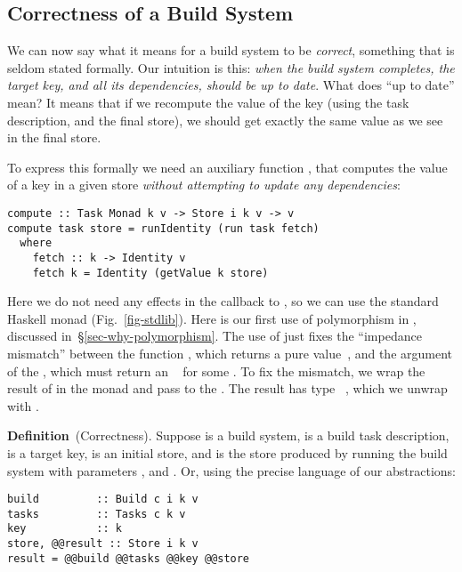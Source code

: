 \subsection{Correctness of a Build System}\label{sec-build-correctness}

We can now say what it means for a build system to be \emph{correct}, something
that is seldom stated formally. Our intuition is this: \emph{when the build
system completes, the target key, and all its dependencies, should be up to
date}. What does ``up to date'' mean? It means that if we recompute the value of
the key (using the task description, and the final store), we should get exactly
the same value as we see in the final store.

To express this formally we need an auxiliary function , that
computes the value of a key in a given store \emph{without attempting to update
any dependencies}:

\begin{verbatim}
compute :: Task Monad k v -> Store i k v -> v
compute task store = runIdentity (run task fetch)
  where
    fetch :: k -> Identity v
    fetch k = Identity (getValue k store)
\end{verbatim}

\noindent
Here we do not need any effects in the  callback to , so
we can use the standard Haskell  monad (Fig.~\ref{fig-stdlib}).
Here is our first use of polymorphism in , discussed in~\S\ref{sec-why-polymorphism}.
The use of  just fixes the ``impedance mismatch'' between the
function , which returns a pure value~, and the 
argument of the , which must return an ~ for some .
To fix the mismatch, we wrap the result of  in the 
monad and pass to the . The result has type ~, which
we unwrap with .

\vspace{2mm}
\textbf{Definition}~(Correctness). Suppose  is a build system,
 is a build task description,  is a target key,  is
an initial store, and  is the store produced by running the build
system with parameters ,  and . Or, using the
precise language of our abstractions:

\begin{verbatim}
build         :: Build c i k v
tasks         :: Tasks c k v
key           :: k
store, @@result :: Store i k v
result = @@build @@tasks @@key @@store
\end{verbatim}

